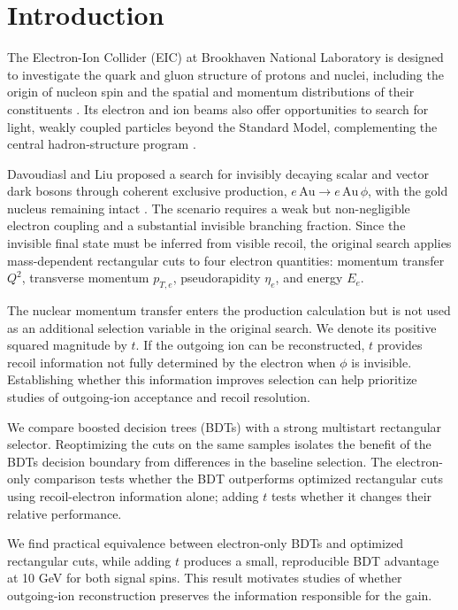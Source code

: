 \documentclass[particles,article,submit,moreauthors,pdftex]{Definitions/mdpi}
\begin{document}
\section{Introduction}\label{sec:1}

The Electron-Ion Collider (EIC) at Brookhaven National Laboratory is designed to investigate the quark and gluon structure of protons and nuclei, including the origin of nucleon spin and the spatial and momentum distributions of their constituents \citep{ref7}. Its electron and ion beams also offer opportunities to search for light, weakly coupled particles beyond the Standard Model, complementing the central hadron-structure program \citep{ref1,ref2}.

Davoudiasl and Liu proposed a search for invisibly decaying scalar and vector dark bosons through coherent exclusive production, $e\,\mathrm{Au}\to e\,\mathrm{Au}\,\phi$, with the gold nucleus remaining intact \citep{ref1,ref2}. The scenario requires a weak but non-negligible electron coupling and a substantial invisible branching fraction. Since the invisible final state must be inferred from visible recoil, the original search applies mass-dependent rectangular cuts to four electron quantities: momentum transfer $Q^2$, transverse momentum $p_{T,e}$, pseudorapidity $\eta_e$, and energy $E_e$.

The nuclear momentum transfer enters the production calculation but is not used as an additional selection variable in the original search. We denote its positive squared magnitude by $t$. If the outgoing ion can be reconstructed, $t$ provides recoil information not fully determined by the electron when $\phi$ is invisible. Establishing whether this information improves selection can help prioritize studies of outgoing-ion acceptance and recoil resolution.

We compare boosted decision trees (BDTs) with a strong multistart rectangular selector. Reoptimizing the cuts on the same samples isolates the benefit of the BDT\textquotesingle s decision boundary from differences in the baseline selection. The electron-only comparison tests whether the BDT outperforms optimized rectangular cuts using recoil-electron information alone; adding $t$ tests whether it changes their relative performance.

We find practical equivalence between electron-only BDTs and optimized rectangular cuts, while adding $t$ produces a small, reproducible BDT advantage at 10 GeV for both signal spins. This result motivates studies of whether outgoing-ion reconstruction preserves the information responsible for the gain.
\end{document}
